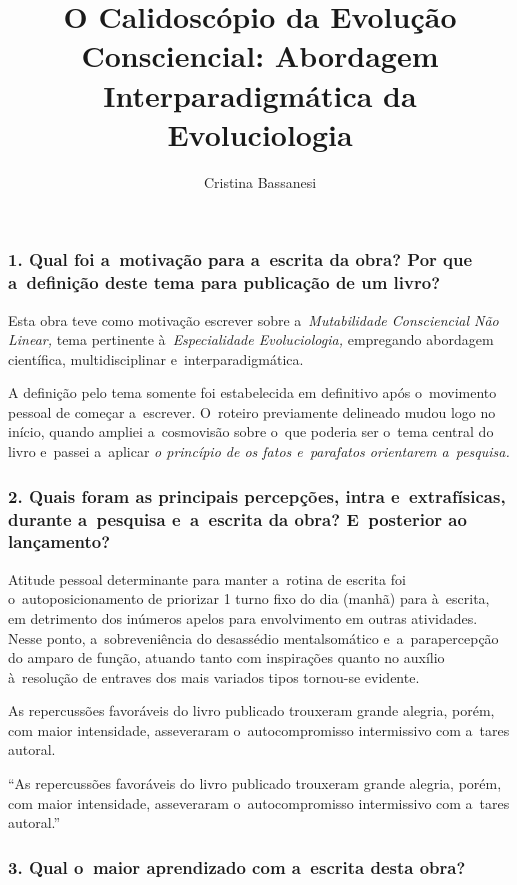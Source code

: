 \documentclass{gescons}
\author{Cristina Bassanesi}
\title{O Calidoscópio da Evolução Consciencial: Abordagem Interparadigmática da Evoluciologia}
\begin{document}
    \makeentrevistatitle

    \begin{multicols}{2}

\subsubsection{1. Qual foi a~motivação para a~escrita da obra? Por que a~definição deste tema para publicação de um livro?}

Esta obra teve como motivação escrever sobre a~\textit{Mutabilidade Consciencial Não Linear,} tema pertinente à~\textit{Especialidade Evoluciologia,} empregando abordagem científica, multidisciplinar e~interparadigmática.

A definição pelo tema somente foi estabelecida em definitivo após o~movimento pessoal de começar a~escrever. O~roteiro previamente delineado mudou logo no início, quando ampliei a~cosmovisão sobre o~que poderia ser o~tema central do livro e~passei a~aplicar \textit{o princípio de os fatos e~parafatos orientarem a~pesquisa.}

\subsubsection{2. Quais foram as principais percepções, intra e~extrafísicas, durante a~pesquisa e~a~escrita da obra? E~posterior ao lançamento?}

Atitude pessoal determinante para manter a~rotina de escrita foi o~autoposicionamento de priorizar 1 turno fixo do dia (manhã) para à~escrita, em detrimento dos inúmeros apelos para envolvimento em outras atividades. Nesse ponto, a~sobreveniência do desassédio mentalsomático e~a~parapercepção do amparo de função, atuando tanto com inspirações quanto no auxílio à~resolução de entraves dos mais variados tipos tornou-se evidente.

As repercussões favoráveis do livro publicado trouxeram grande alegria, porém, com maior intensidade, asseveraram o~autocompromisso intermissivo com a~tares autoral. 

\begin{pullquote}
``As repercussões favoráveis do livro publicado trouxeram grande alegria, porém, com maior intensidade, asseveraram o~autocompromisso intermissivo com a~tares autoral.''
\end{pullquote}

\subsubsection{3. Qual o~maior aprendizado com a~escrita desta obra?}


\end{multicols}
\end{document}
